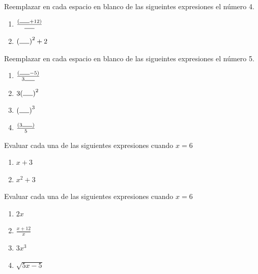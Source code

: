 \begin{ejemplo} Reemplazar en cada espacio en blanco de las sigueintes expresiones el número 4.
	\begin{multicols}{2}
		\begin{enumerate}[label=\Alph*)]
			\item $\frac{(\rule{5mm}{0.15mm} + 12 )}{\rule{5mm}{0.15mm}}$
			\item ${(\rule{5mm}{0.15mm})}^2 + 2$
		\end{enumerate}
	\end{multicols}
\end{ejemplo}

\begin{exer} Reemplazar en cada espacio en blanco de las sigueintes expresiones el número 5.
	\begin{multicols}{2}
		\begin{enumerate}[label=\Alph*)]
			\item $\frac{(\rule{5mm}{0.15mm} -5  )}{3 \rule{5mm}{0.15mm}}$
			\item $3 {(\rule{5mm}{0.15mm})}^2 $
			\item $ {(\rule{5mm}{0.15mm})}^3 $
			\item $\frac{(3 \rule{5mm}{0.15mm}  )}{5}$
		\end{enumerate}
	\end{multicols}
\end{exer}

\begin{ejemplo} Evaluar cada una de las siguientes expresiones cuando $x=6$
	\begin{multicols}{2}
		\begin{enumerate}[label=\Alph*)]
			\item $x+3$
			\item $x^2 + 3$
		\end{enumerate}
	\end{multicols}
\end{ejemplo}

\begin{exer} Evaluar cada una de las siguientes expresiones cuando $x=6$
	\begin{multicols}{2}
		\begin{enumerate}[label=\Alph*)]
			\item $2x$
			\item $\frac{x+12}{x}$
			\item $3x^3$
			\item $\sqrt{5x-5}$
		\end{enumerate}
	\end{multicols}
\end{exer}

